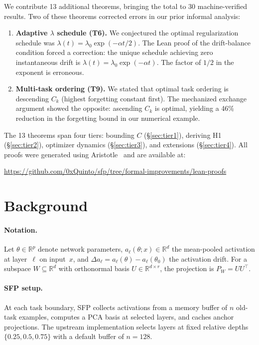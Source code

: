 \documentclass[11pt,a4paper]{article}
\theoremstyle{definition}
\newcommand{\R}{\mathbb{R}}
\newcommand{\proj}[1]{P_{#1}}
\begin{document}
We contribute 13 additional theorems, bringing the total to 30 machine-verified results. Two of these theorems corrected errors in our prior informal analysis:

\begin{enumerate}[nosep]
\item \textbf{Adaptive $\lambda$ schedule (T6).} We conjectured the optimal regularization schedule was $\lambda(t) = \lambda_0 \exp(-\alpha t / 2)$. The Lean proof of the drift-balance condition forced a correction: the unique schedule achieving zero instantaneous drift is $\lambda(t) = \lambda_0 \exp(-\alpha t)$. The factor of $1/2$ in the exponent is erroneous.

\item \textbf{Multi-task ordering (T9).} We stated that optimal task ordering is descending $C_k$ (highest forgetting constant first). The mechanized exchange argument showed the opposite: ascending $C_k$ is optimal, yielding a 46\% reduction in the forgetting bound in our numerical example.
\end{enumerate}

The 13 theorems span four tiers: bounding $C$ (\S\ref{sec:tier1}), deriving H1 (\S\ref{sec:tier2}), optimizer dynamics (\S\ref{sec:tier3}), and extensions (\S\ref{sec:tier4}). All proofs were generated using Aristotle~\citep{aristotle2025} and are available at:

\smallskip
\noindent\url{https://github.com/0xQuinto/sfp/tree/formal-improvements/lean-proofs}

\section{Background}
\label{sec:background}

\paragraph{Notation.} Let $\theta \in \R^p$ denote network parameters, $a_\ell(\theta; x) \in \R^d$ the mean-pooled activation at layer~$\ell$ on input~$x$, and $\Delta a_\ell = a_\ell(\theta) - a_\ell(\theta_0)$ the activation drift. For a subspace $W \subseteq \R^d$ with orthonormal basis $U \in \R^{d \times r}$, the projection is $\proj{W} = UU^\top$.

\paragraph{SFP setup.} At each task boundary, SFP collects activations from a memory buffer of $n$ old-task examples, computes a PCA basis at selected layers, and caches anchor projections. The upstream implementation selects layers at fixed relative depths $\{0.25, 0.5, 0.75\}$ with a default buffer of $n = 128$.
\end{document}
